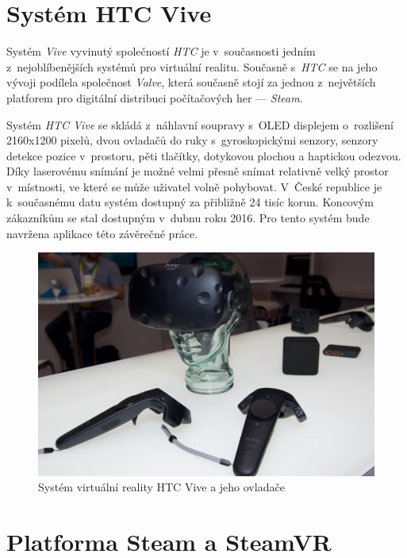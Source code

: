 \section{Systém HTC Vive}\label{systuxe9m-htc-vive}

Systém \emph{Vive} vyvinutý společností \emph{HTC} je v~současnosti jedním z~nejoblíbenějších systémů pro virtuální realitu. \autocite{vivepopular} Současně
s~\emph{HTC} se na jeho vývoji podílela společnost \emph{Valve}, která současně stojí za jednou z~největších platforem pro digitální
distribuci počítačových her --- \emph{Steam}.

Systém \emph{HTC Vive} se skládá z~náhlavní soupravy s~OLED displejem
o~rozlišení 2160x1200 pixelů, dvou ovladačů do ruky s~gyroskopickými senzory,
senzory detekce pozice v~prostoru, pěti tlačítky, dotykovou plochou a
haptickou odezvou. \autocite{vivespec} Díky laserovému snímání je možné velmi přesně snímat
relativně velký prostor v~místnosti, ve které se může uživatel volně
pohybovat. V~České republice je k~současnému datu systém dostupný za
přibližně 24 tisíc korun. \autocite{viveprice} Koncovým zákazníkům se stal dostupným v~dubnu
roku 2016. Pro tento systém bude navržena aplikace této závěrečné práce.

\begin{figure}[h!]
\centering
\includegraphics[width=12cm]{src/assets/vive-pre.jpeg}
\caption{Systém virtuální reality HTC Vive a jeho ovladače\autocite{htcvivepre}}
\end{figure}

\newpage

\section{Platforma Steam a SteamVR}\label{platforma-steam-a-steamvr}

